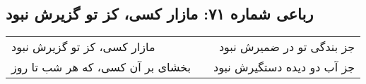 \begin{center}
\section*{رباعی شماره ۷۱: مازار کسی، کز تو گزیرش نبود}
\label{sec:071}
\begin{longtable}{l p{0.5cm} r}
مازار کسی، کز تو گزیرش نبود
&&
جز بندگی تو در ضمیرش نبود
\\
بخشای بر آن کسی، که هر شب تا روز
&&
جز آب دو دیده دستگیرش نبود
\\
\end{longtable}
\end{center}
